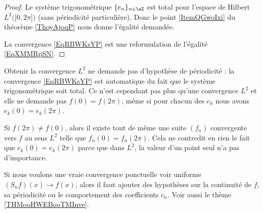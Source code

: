 \begin{proof}
    Le système trigonométrique \( \{ e_n \}_{n\in \eZ}\) est total pour l'espace de Hilbert \( L^2\big( \mathopen[ 0 , 2\pi \mathclose] \big)\) (sans périodicité particulière). Donc le point \ref{ItemQGwoIxi} du théorème \ref{ThoyAjoqP} nous donne l'égalité demandée.

    La convergence \eqref{EqRBWKsYP} est une reformulation de l'égalité \eqref{EqXMMRpSN}.
\end{proof}

\begin{normaltext}
    Obtenir la convergence \( L^2\) ne demande pas d'hypothèse de périodicité : la convergence \eqref{EqRBWKsYP} est automatique du fait que le système trigonométrique soit total. Ce n'est cependant pas plus qu'une convergence \( L^2\) et elle ne demande pas \( f(0)=f(2\pi)\), même si pour chacun des \( e_k\) nous avons \( e_k(0)=e_k(2\pi)\).

    Si \( f(2\pi)\neq f(0)\), alors il existe tout de même une suite \( (f_n)\) convergente vers \( f\) au sens \( L^2\) telle que \( f_n(0)=f_n(2\pi)\). Cela ne contredit en rien le fait que \( e_k(0)=e_k(2\pi)\) parce que dans \( L^2\), la valeur d'un point seul n'a pas d'importance.

    Si nous voulons une vraie convergence ponctuelle voir uniforme \( (S_nf)(x)\to f(x)\), alors il faut ajouter des hypothèses sur la continuité de \( f\), sa périodicité ou le comportement des coefficients \( c_n\). Voir aussi le thème \ref{THMooHWEBooTMInve}.
\end{normaltext}

